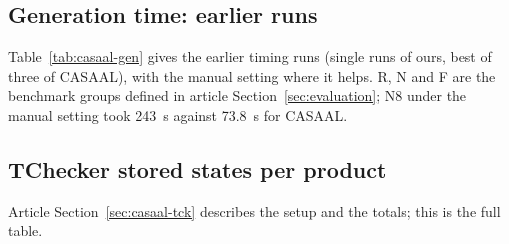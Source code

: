 \subsection{Generation time: earlier runs}
\label{sec:gen-earlier}
Table~\ref{tab:casaal-gen} gives the earlier timing runs (single runs of ours, best of three of CASAAL), with the manual setting where it helps. R, N and F are the benchmark groups defined in article Section~\ref{sec:evaluation}; N8 under the manual setting took 243~s against 73.8~s for CASAAL.


\subsection{TChecker stored states per product}
Article Section~\ref{sec:casaal-tck} describes the setup and the totals; this is the full table.


